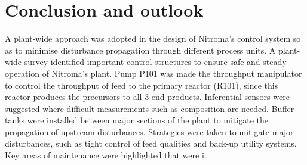 \section{Conclusion and outlook}
A plant-wide approach was adopted in the design of Nitroma's control system so as to minimise disturbance propagation through different process units. A plant-wide survey identified important control structures to ensure safe and steady operation of Nitroma's plant. Pump P101 was made the throughput manipulator to control the throughput of feed to the primary reactor (R101), since this reactor produces the precursors to all 3 end products. Inferential sensors were suggested where difficult measurements such as composition are needed. Buffer tanks were installed between major sections of the plant to mitigate the propagation of upstream disturbances. Strategies were taken to mitigate major disturbances, such as tight control of feed qualities and back-up utility systems. Key areas of maintenance were highlighted that were i.